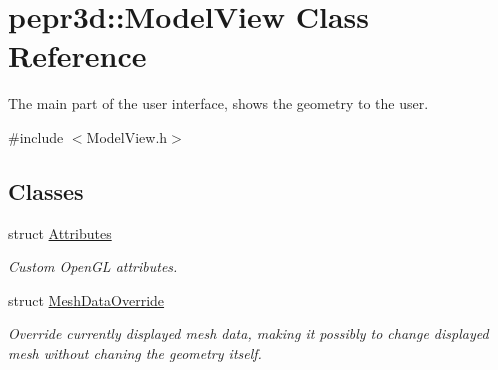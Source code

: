 \hypertarget{classpepr3d_1_1_model_view}{}\section{pepr3d\+::Model\+View Class Reference}
\label{classpepr3d_1_1_model_view}


The main part of the user interface, shows the geometry to the user.  




{\ttfamily \#include $<$Model\+View.\+h$>$}

\subsection*{Classes}
\begin{DoxyCompactItemize}
\item 
struct \mbox{\hyperlink{structpepr3d_1_1_model_view_1_1_attributes}{Attributes}}
\begin{DoxyCompactList}\small\item\em Custom Open\+GL attributes. \end{DoxyCompactList}\item 
struct \mbox{\hyperlink{structpepr3d_1_1_model_view_1_1_mesh_data_override}{Mesh\+Data\+Override}}
\begin{DoxyCompactList}\small\item\em Override currently displayed mesh data, making it possibly to change displayed mesh without chaning the geometry itself. \end{DoxyCompactList}\end{DoxyCompactItemize}
